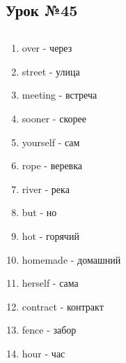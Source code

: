 \subsection{Урок №45}

\subsection*{}
\begin{multicols}{2}
    \begin{enumerate}\setlength{\itemsep}{0pt}
        \item over - через
        \item street - улица
        \item meeting - встреча
        \item sooner - скорее
        \item yourself - сам
        \item rope - веревка
        \item river - река
        \item but - но
        \item hot - горячий
        \item homemade - домашний
        \item herself - сама
        \item contract - контракт
        \item fence - забор
        \item hour - час
    \end{enumerate}
\end{multicols}
